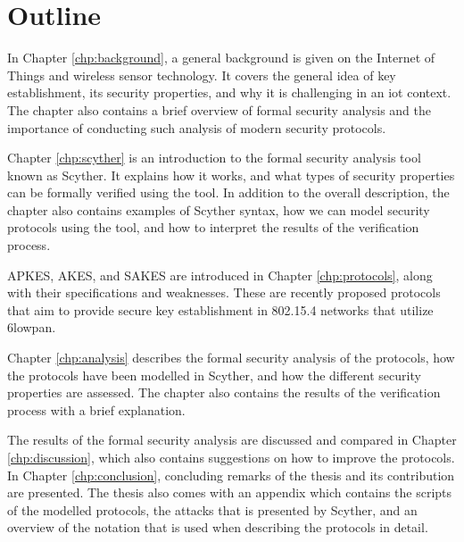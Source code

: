 
\section{Outline}

In Chapter \ref{chp:background}, a general background is given on the Internet of Things and wireless sensor technology. It covers the general idea of key establishment, its security properties, and why it is challenging in an \gls{iot} context. The chapter also contains a brief overview of formal security analysis and the importance of conducting such analysis of modern security protocols.

Chapter \ref{chp:scyther} is an introduction to the formal security analysis tool known as Scyther. It explains how it works, and what types of security properties can be formally verified using the tool. In addition to the overall description, the chapter also contains examples of Scyther syntax, how we can model security protocols using the tool, and how to interpret the results of the verification process.

APKES, AKES, and SAKES are introduced in Chapter \ref{chp:protocols}, along with their specifications and weaknesses. These are recently proposed protocols that aim to provide secure key establishment in 802.15.4 networks that utilize \gls{6lowpan}.

Chapter \ref{chp:analysis} describes the formal security analysis of the protocols, how the protocols have been modelled in Scyther, and how the different security properties are assessed. The chapter also contains the results of the verification process with a brief explanation.

The results of the formal security analysis are discussed and compared in Chapter \ref{chp:discussion}, which also contains suggestions on how to improve the protocols.  In Chapter \ref{chp:conclusion}, concluding remarks of the thesis and its contribution are presented. The thesis also comes with an appendix which contains the scripts of the modelled protocols, the attacks that is presented by Scyther, and an overview of the notation that is used when describing the protocols in detail.